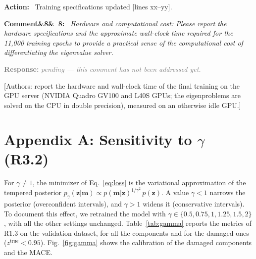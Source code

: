 \documentclass[11pt]{article}
\newenvironment{rcomment}[1]{\par\bigskip\noindent\textbf{Comment\ifx&#1&\else\ #1\fi:}\ \itshape}{\par}
\newenvironment{action}{\par\smallskip\noindent\color{resp}\textbf{Action:}\ }{\par}
\newcommand{\pending}{\par\smallskip\noindent\textcolor{gray}{\textbf{Response:} \textit{pending --- this comment
has not been addressed yet.}}\par}
\newcommand{\authornote}[1]{\textcolor{note}{\textsf{[Authors: #1]}}}
\newcommand{\tbd}[1]{\textcolor{note}{\textsf{[#1]}}}
\newcommand{\lines}[1]{\tbd{lines #1}}
\newcommand{\m}{\mathbf{m}}
\newcommand{\z}{\mathbf{z}}
\begin{document}
\begin{action}
Training specifications updated \lines{xx--yy}.
\end{action}

\begin{rcomment}{8}
Hardware and computational cost: Please report the hardware specifications and the approximate wall-clock time
required for the 11,000 training epochs to provide a practical sense of the computational cost of differentiating the
eigenvalue solver.
\end{rcomment}
\pending
\authornote{report the hardware and wall-clock time of the final training on the GPU server (NVIDIA Quadro GV100 and L40S GPUs; the eigenproblems are solved on the CPU in double precision), measured on an otherwise idle GPU.}

\appendix
\section{Appendix A: Sensitivity to $\gamma$ (R3.2)}
\label{app:gamma}
For $\gamma\neq1$, the minimizer of Eq.~\eqref{eq:loss} is the variational approximation of the tempered posterior $p_\gamma(\z|\m)\propto p(\m|\z)^{1/\gamma^2}\,p(\z)$.
A value $\gamma<1$ narrows the posterior (overconfident intervals), and $\gamma>1$ widens it (conservative intervals).
To document this effect, we retrained the model with $\gamma\in\{0.5,0.75,1,1.25,1.5,2\}$, with all the other settings unchanged.
Table~\ref{tab:gamma} reports the metrics of R1.3 on the validation dataset, for all the components and for the damaged ones ($z^{\text{true}}<0.95$).
Fig.~\ref{fig:gamma} shows the calibration of the damaged components and the MACE.
\end{document}
